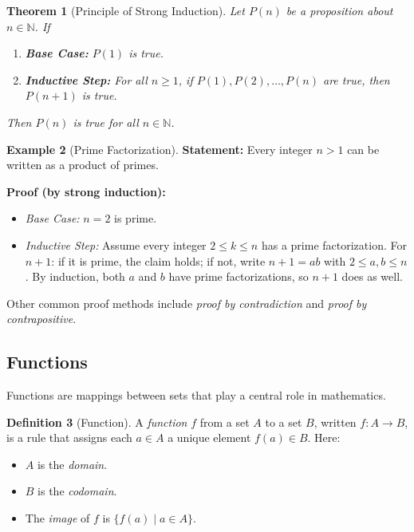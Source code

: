 \documentclass[12pt]{article}
\newtheorem{theorem}{Theorem}[section]
\theoremstyle{definition}
\newtheorem{definition}[theorem]{Definition}
\newtheorem{example}[theorem]{Example}
\begin{document}
\begin{theorem}[Principle of Strong Induction]
  Let \(P(n)\) be a proposition about \(n \in \mathbb{N}\). If
  \begin{enumerate}[label=(\roman*)]
    \item \textbf{Base Case:} \(P(1)\) is true.
    \item \textbf{Inductive Step:} For all \(n \ge 1\), if \(P(1), P(2), \dots, P(n)\) are true, then \(P(n+1)\) is true.
  \end{enumerate}
  Then \(P(n)\) is true for all \(n \in \mathbb{N}\).
\end{theorem}

\begin{example}[Prime Factorization]
  \textbf{Statement:} Every integer \(n > 1\) can be written as a product of primes.

  \textbf{Proof (by strong induction):}
  \begin{itemize}[itemsep=3pt]
    \item \emph{Base Case:} \(n = 2\) is prime.
    \item \emph{Inductive Step:} Assume every integer \(2 \le k \le n\) has a prime factorization. For \(n+1\): if it is prime, the claim holds; if not, write \(n+1 = ab\) with \(2 \le a,b \le n\). By induction, both \(a\) and \(b\) have prime factorizations, so \(n+1\) does as well.
  \end{itemize}
\end{example}

Other common proof methods include \emph{proof by contradiction} and \emph{proof by contrapositive}.

\subsection{Functions}

Functions are mappings between sets that play a central role in mathematics.

\begin{definition}[Function]
  A \emph{function} \(f\) from a set \(A\) to a set \(B\), written \(f: A \to B\), is a rule that assigns each \(a \in A\) a unique element \(f(a) \in B\). Here:
  \begin{itemize}[itemsep=3pt]
    \item \(A\) is the \emph{domain}.
    \item \(B\) is the \emph{codomain}.
    \item The \emph{image} of \(f\) is \(\{ f(a) \mid a \in A \}\).
  \end{itemize}
\end{definition}
\end{document}
